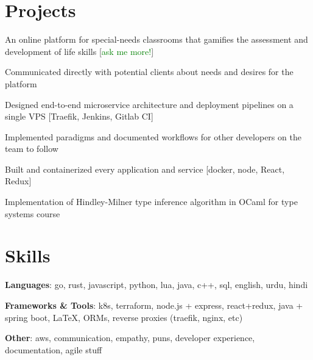 \documentclass[letterpaper]{deedy-resume} %
\begin{document}
\begin{minipage}[t]{1.0\textwidth}
\section{Projects}


An online platform for special-needs classrooms that gamifies the assessment and development of life skills [\textcolor{green}{ask me more!}]
\begin{tightitemize}
\item Communicated directly with potential clients about needs and desires for the platform
\item Designed end-to-end microservice architecture and deployment pipelines on a single VPS [Traefik, Jenkins, Gitlab CI]
\item Implemented paradigms and documented workflows for other developers on the team to follow
\item Built and containerized every application and service [docker, node, React, Redux]
\end{tightitemize}

Implementation of Hindley-Milner type inference algorithm in OCaml for type systems course

\sectionspace %

\section{Skills}

\textbf{Languages}: go, rust, javascript, python, lua, java, c++, sql, english, urdu, hindi

\textbf{Frameworks \& Tools}: k8s, terraform, node.js + express, react+redux, java + spring boot, \LaTeX, ORMs, reverse proxies (traefik, nginx, etc)

\textbf{Other}: aws, communication, empathy, puns, developer experience, documentation, agile stuff



\end{minipage} %
\end{document}
